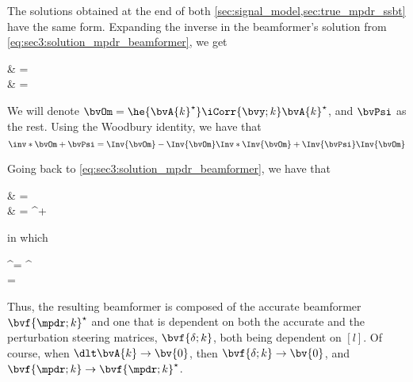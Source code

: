 The solutions obtained at the end of both \cref{sec:signal_model,sec:true_mpdr_ssbt} have the same form. Expanding the inverse in the beamformer's solution from \cref{eq:sec3:solution_mpdr_beamformer}, we get
\begin{equations}
	& =  \\
	& = 
\end{equations}
We will denote $\bvOm = \he{{\bvA{k}^\star}} \iCorr{\bvy;k} \bvA{k}^\star$, and $\bvPsi$ as the rest. Using the Woodbury identity, we have that
\begin{equation}
\inv*{ \bvOm + \bvPsi} = \Inv{\bvOm} - \Inv{\bvOm}\Inv*{\Inv{\bvOm} + \Inv{\bvPsi}} \Inv{\bvOm}
\end{equation}

Going back to \cref{eq:sec3:solution_mpdr_beamformer}, we have that
\begin{equations}
	& =   \pts{\Inv{\bvOm} - \Inv{\bvOm}\Inv*{\Inv{\bvOm} + \Inv{\bvPsi}} \Inv{\bvOm}} \bvi{\Delta} \\
	& = ^\star + 
\end{equations}
in which
\begin{subgather}
	^\star =  ^\star {} \bvi{\Delta} \\
	 =  \bvi{\Delta} 
\end{subgather}

Thus, the resulting beamformer is composed of the accurate beamformer $\bvf{\mpdr;k}^\star$ and one that is dependent on both the accurate and the perturbation steering matrices, $\bvf{\delta;k}$, both being dependent on $[l]$. Of course, when $\dlt\bvA{k} \to \bv{0}$, then $\bvf{\delta;k} \to \bv{0}$, and $\bvf{\mpdr;k} \to \bvf{\mpdr;k}^\star$.


